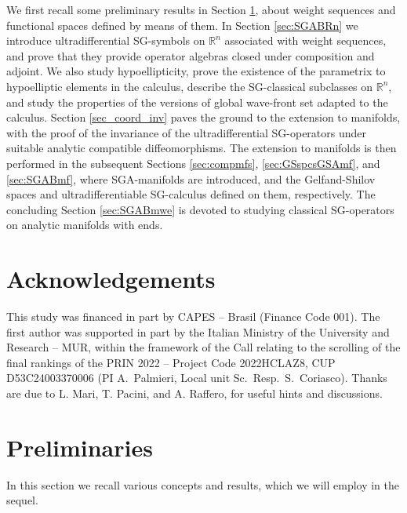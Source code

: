 \documentclass[11pt,reqno]{amsart}
\numberwithin{equation}{section}
\newcommand{\R}{{\mathbb{R}}} %
\begin{document}
We first recall some preliminary results in Section \ref{sec:prel}, about weight sequences and functional spaces defined by means of them. 
In Section \ref{sec:SGABRn} we introduce ultradifferential SG-symbols on $\R^n$ associated with weight sequences, and prove that they provide operator algebras
closed under composition and adjoint. We also study hypoellipticity, prove the existence of the parametrix to hypoelliptic elements in the calculus, 
describe the SG-classical subclasses on $\R^n$, and study the properties of the versions of global wave-front set adapted to the calculus. 
Section \ref{sec_coord_inv} paves the ground to the extension to manifolds, with the proof of the invariance of the ultradifferential SG-operators
under suitable analytic compatible diffeomorphisms. The extension to manifolds is then performed in the subsequent Sections \ref{sec:compmfs}, \ref{sec:GSspcsGSAmf}, 
and \ref{sec:SGABmf}, where SGA-manifolds are introduced, and the Gelfand-Shilov spaces and ultradifferentiable SG-calculus defined on them, respectively. 
The concluding Section \ref{sec:SGABmwe} is devoted to studying classical SG-operators on
analytic manifolds with ends.

\section*{Acknowledgements}
This study was financed in part by CAPES -- Brasil (Finance Code 001). The first author was supported in part by the Italian Ministry of the University and Research -- MUR, within the framework of the Call relating to the scrolling of the final rankings of the PRIN 2022 -- Project Code 2022HCLAZ8, CUP D53C24003370006 (PI A.~Palmieri, Local unit Sc.~Resp.~S.~Coriasco). Thanks are due to L. Mari, T. Pacini, and A. Raffero, for useful hints and discussions.



\section{Preliminaries}\label{sec:prel}
In this section we recall various concepts and results, which we will employ in the sequel.
\end{document}
